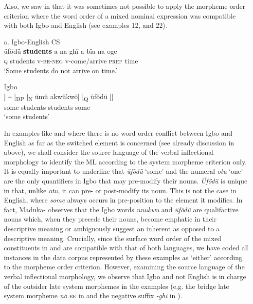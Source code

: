 \documentclass[output=paper]{langsci/langscibook}
\begin{document}
Also, we saw in  that it was sometimes not possible to apply the morpheme order criterion where the word order of a mixed nominal expression was compatible with both Igbo and English (see examples 12, and 22).

\ea
{a. Igbo-English CS}\\
\gll üfödü  \textbf{students}\textbf{  }a-na-ghï   a-bïa    na   oge\\
     \textsc{q}     students  \textsc{v-be-neg}  \textsc{v}{}-come/arrive  \textsc{prep}  time   \\
\glt ‘Some students do not arrive on time.’
\z

\ea
{Igbo }\\
\gll [\textsubscript{DP}\textsuperscript{ }[\textsubscript{Q }üfödü]  [\textsubscript{N }ümü akwükwö]] {\textasciitilde} [\textsubscript{DP }[\textsubscript{N  }ümü akwükwö]  [\textsubscript{Q }üfödü\textsubscript{ }]]\\
           some      students              students        some\\
\glt ‘some students’
\z

In examples like  and  where there is no word order conflict between Igbo and English as far as the switched element is concerned (see already discussion in  above), we shall consider the source language of the verbal inflectional morphology to identify the ML according to the system morpheme criterion only. It is equally important to underline that \textit{üfödü} ‘some’ and the numeral \textit{otu} ‘one’ are the only quantifiers in Igbo that may pre-modify their nouns. \textit{Üfödü} is unique in that, unlike \textit{otu}, it can pre- or post-modify its noun. This is not the case in English, where \textit{some} always occurs in pre-position to the element it modifies. In fact, Maduka-\citet[239]{Durunze1990} observes that the Igbo words \textit{nnukwu} and \textit{üfödü} are qualifactive nouns which, when they precede their nouns, become emphatic in their descriptive meaning or ambiguously suggest an inherent as opposed to a descriptive meaning. Crucially, since the surface word order of the mixed constituents in  and  are compatible with that of both languages, we have coded all instances in the data corpus represented by these examples as ‘either’ according to the morpheme order criterion. However, examining the source language of the verbal inflectional morphology, we observe that Igbo and not English is in charge of the outsider late system morphemes in the examples (e.g. the bridge late system morpheme \textit{nö }\textsc{be} in  and the negative suffix \textit{{}-ghi }in ). 
\end{document}
